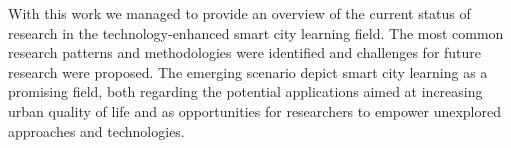 With this work we managed to provide an overview of the current status of research in the technology-enhanced smart city learning field.
The most common research patterns and methodologies were identified and challenges for future research were proposed.
The emerging scenario depict smart city learning as a promising field, both regarding the potential applications aimed at increasing urban quality of life and as opportunities for researchers to empower unexplored approaches and technologies.